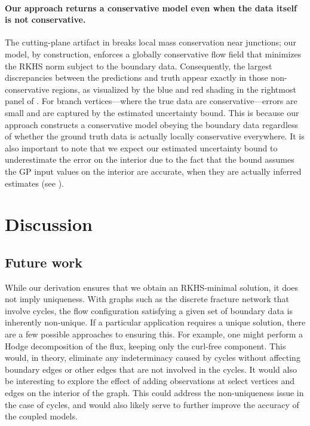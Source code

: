 \documentclass{article}
\theoremstyle{definition}
\theoremstyle{remark}
\begin{document}
\paragraph{Our approach returns a conservative model even when the data itself is not conservative.} The cutting-plane artifact in \cite{pegolotti_learning_2023} breaks local mass conservation near junctions; our model, by construction, enforces a globally conservative flow field that minimizes the RKHS norm subject to the boundary data. Consequently, the largest discrepancies between the predictions and truth appear exactly in those non-conservative regions, as visualized by the blue and red shading in the rightmost panel of . For branch vertices---where the true data are conservative---errors are small and are captured by the estimated uncertainty bound. This is because our approach constructs a conservative model obeying the boundary data regardless of whether the ground truth data is actually locally conservative everywhere. It is also important to note that we expect our estimated uncertainty bound to underestimate the error on the interior due to the fact that the bound assumes the GP input values on the interior are accurate, when they are actually inferred estimates (see ).

\section{Discussion}


\subsection{Future work}

While our derivation ensures that we obtain an RKHS-minimal solution, it does not imply uniqueness. With graphs such as the discrete fracture network that involve cycles, the flow configuration satisfying a given set of boundary data is inherently non-unique. If a particular application requires a unique solution, there are a few possible approaches to ensuring this. For example, one might perform a Hodge decomposition of the flux, keeping only the curl-free component. This would, in theory, eliminate any indeterminacy caused by cycles without affecting boundary edges or other edges that are not involved in the cycles. It would also be interesting to explore the effect of adding observations at select vertices and edges on the interior of the graph. This could address the non-uniqueness issue in the case of cycles, and would also likely serve to further improve the accuracy of the coupled models.
\end{document}
